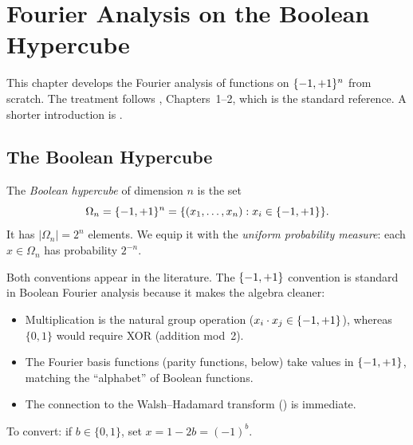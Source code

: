 
\chapter{Fourier Analysis on the Boolean Hypercube}\label{ch:boolean-fourier}

This chapter develops the Fourier analysis of functions on $\{-1,+1\}^n$
from scratch. The treatment follows \citet{odonnell2014analysis},
Chapters~1--2, which is the standard reference. A shorter introduction
is \citet{dewolf2008brief}.

\section{The Boolean Hypercube}\label{sec:hypercube}

\begin{definition}\label{def:hypercube}
The \emph{Boolean hypercube} of dimension $n$ is the set
\[
  \Omega_n = \{-1,+1\}^n = \{(x_1, \ldots, x_n) : x_i \in \{-1, +1\}\}.
\]
It has $|\Omega_n| = 2^n$ elements. We equip it with the \emph{uniform
probability measure}: each $x \in \Omega_n$ has probability $2^{-n}$.
\end{definition}

\begin{remark}\label{rem:pm1-vs-01}
Both conventions appear in the literature. The $\{-1,+1\}$ convention is
standard in Boolean Fourier analysis because it makes the algebra cleaner:
\begin{itemize}
  \item Multiplication is the natural group operation ($x_i \cdot x_j \in \{-1,+1\}$),
        whereas $\{0,1\}$ would require XOR (addition mod~2).
  \item The Fourier basis functions (parity functions, below) take values
        in $\{-1,+1\}$, matching the ``alphabet'' of Boolean functions.
  \item The connection to the Walsh--Hadamard transform ()
        is immediate.
\end{itemize}
To convert: if $b \in \{0,1\}$, set $x = 1 - 2b = (-1)^b$.
\end{remark}


